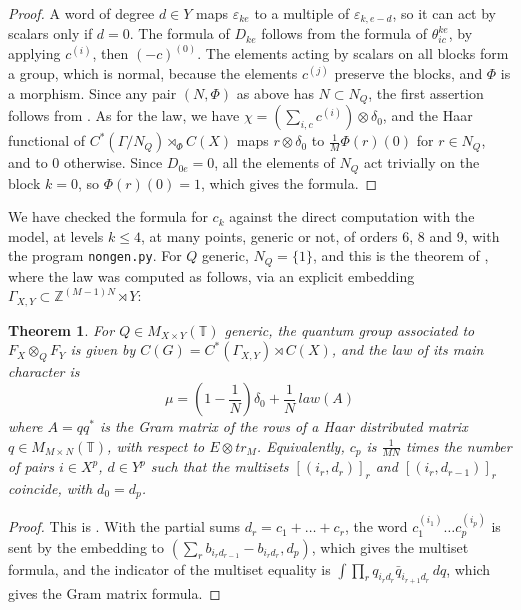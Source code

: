 \documentclass[11pt]{amsart}
\newtheorem{theorem}{Theorem}[section]
\newcommand{\T}{\mathbb T}
\begin{document}
\begin{proof}
A word of degree $d\in Y$ maps $\varepsilon_{ke}$ to a multiple of $\varepsilon_{k,e-d}$, so it can act by scalars only if $d=0$. The formula of $D_{ke}$ follows from the formula of $\theta_{ic}^{ke}$, by applying $c^{(i)}$, then $(-c)^{(0)}$. The elements acting by scalars on all blocks form a group, which is normal, because the elements $c^{(j)}$ preserve the blocks, and $\Phi$ is a morphism. Since any pair $(N,\Phi)$ as above has $N\subset N_Q$, the first assertion follows from \cite[Proposition 4.1]{bic}. As for the law, we have $\chi=(\sum_{i,c}c^{(i)})\otimes\delta_0$, and the Haar functional of $C^*(\Gamma/N_Q)\rtimes_\Phi C(X)$ maps $r\otimes\delta_0$ to $\frac{1}{M}\Phi(r)(0)$ for $r\in N_Q$, and to $0$ otherwise. Since $D_{0e}=0$, all the elements of $N_Q$ act trivially on the block $k=0$, so $\Phi(r)(0)=1$, which gives the formula.
\end{proof}

\noindent We have checked the formula for $c_k$ against the direct computation with the model, at levels $k\leq4$, at many points, generic or not, of orders 6, 8 and 9, with the program \texttt{nongen.py}. For $Q$ generic, $N_Q=\{1\}$, and this is the theorem of \cite{bb3}, where the law was computed as follows, via an explicit embedding $\Gamma_{X,Y}\subset\mathbb Z^{(M-1)N}\rtimes Y$:

\begin{theorem}\label{thm:bb}
For $Q\in M_{X\times Y}(\T)$ generic, the quantum group associated to $F_X\otimes_QF_Y$ is given by $C(G)=C^*(\Gamma_{X,Y})\rtimes C(X)$, and the law of its main character is
$$\mu=\left(1-\frac{1}{N}\right)\delta_0+\frac{1}{N}\,law(A)$$
where $A=qq^*$ is the Gram matrix of the rows of a Haar distributed matrix $q\in M_{M\times N}(\T)$, with respect to $E\otimes tr_M$. Equivalently, $c_p$ is $\frac{1}{MN}$ times the number of pairs $i\in X^p$, $d\in Y^p$ such that the multisets $[(i_r,d_r)]_r$ and $[(i_r,d_{r-1})]_r$ coincide, with $d_0=d_p$.
\end{theorem}

\begin{proof}
This is \cite[Theorem 4.6, Propositions 5.1 and 5.2]{bb3}. With the partial sums $d_r=c_1+\ldots+c_r$, the word $c_1^{(i_1)}\ldots c_p^{(i_p)}$ is sent by the embedding to $(\sum_rb_{i_rd_{r-1}}-b_{i_rd_r},d_p)$, which gives the multiset formula, and the indicator of the multiset equality is $\int\prod_rq_{i_rd_r}\bar{q}_{i_{r+1}d_r}\,dq$, which gives the Gram matrix formula.
\end{proof}
\end{document}
